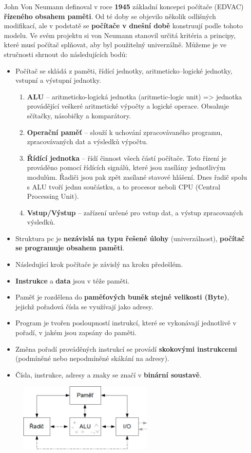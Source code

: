 John Von Neumann definoval v roce \textbf{1945} základní koncepci počítače (EDVAC) \textbf{řízeného obsahem paměti}. Od té doby se objevilo několik odlišných modifikací, ale v podstatě se \textbf{počítače v dnešní době} konstruují podle tohoto modelu. Ve svém projektu si von Neumann stanovil určitá kritéria a principy, které musí počítač splňovat, aby byl použitelný univerzálně. Můžeme je ve stručnosti shrnout do následujících bodů:
\begin{itemize}
\item Počítač se skládá z paměti, řídící jednotky, aritmeticko--logické jednotky, vstupní a  výstupní jednotky.
\begin{enumerate}
\item \textbf{ALU} -- aritmeticko-logická jednotka (aritmetic-logic unit) => jednotka provádějící veškeré aritmetické výpočty a logické operace. Obsahuje sčítačky, násobičky a komparátory.
\item  \textbf{Operační paměť} -- slouží k uchování zpracovávaného programu, zpracovávaných dat a výsledků výpočtu.
\item \textbf{Řídící jednotka} -- řídí činnost všech částí počítače. Toto řízení je prováděno pomocí řídících signálů, které jsou zasílány jednotlivým modulům. Řadiči jsou pak zpět zasílané stavové hlášení. Dnes řadič spolu s ALU tvoří jednu součástku, a to procesor neboli CPU (Central Processing Unit).
\item \textbf{Vstup/Výstup} -- zařízení určené pro vstup dat, a výstup zpracovaných výsledků.
\end{enumerate}
\item Struktura pc je \textbf{nezávislá na typu řešené úlohy} (univerzálnost), \textbf{počítač se programuje obsahem paměti}.
\item Následující krok počítače je závislý na kroku předešlém.
\item \textbf{Instrukce} a \textbf{data} jsou v téže paměti.
\item Paměť je rozdělena do \textbf{paměťových buněk stejné velikosti (Byte)}, jejichž pořadová čísla se využívají jako adresy.
\item Program je tvořen posloupností instrukcí, které se vykonávají jednotlivě v pořadí, v jakém jsou zapsány do paměti.
\item Změna pořadí prováděných instrukcí se provádí \textbf{skokovými instrukcemi} (podmíněné nebo nepodmíněné skákání na adresy). 
\item Čísla, instrukce, adresy a znaky se značí v \textbf{binární soustavě}.
\end{itemize}
\begin{figure}[H]
\centering
\includegraphics[width=0.6\textwidth]{assets/1_vonNeumann}
\end{figure}

